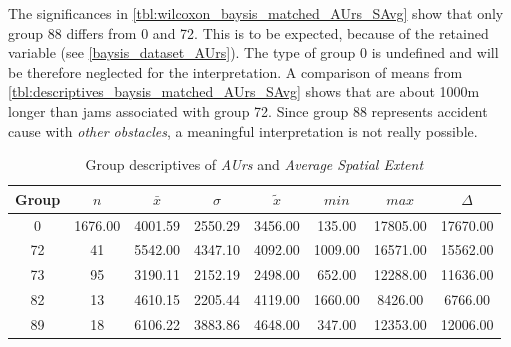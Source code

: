 The significances in \autoref{tbl:wilcoxon_baysis_matched_AUrs_SAvg} show that only group 88 differs from 0 and 72. This is to be expected, because of the retained variable (see \autoref{baysis_dataset_AUrs}). The type of group 0 is undefined and will be therefore neglected for the interpretation. A comparison of means from \autoref{tbl:descriptives_baysis_matched_AUrs_SAvg} shows that are about 1000m longer than jams associated with group 72. Since group 88 represents accident cause with \textit{other obstacles}, a meaningful interpretation is not really possible. 
\begin{table}[ht]
	\small
	\centering
	\begin{tabular}{c|c|c|c|c|c|c|c}
		\toprule
		Group & $n$ & $\bar{x}$ & $\sigma$ & $\tilde{x}$ & $min$ & $max$ & $\Delta$ \\ 
		\midrule
		0  & 1676.00 & 4001.59 & 2550.29 & 3456.00 & 135.00 & 17805.00 & 17670.00 \\ 
		72 & 41 & 5542.00 & 4347.10 & 4092.00 & 1009.00 & 16571.00 & 15562.00 \\ 
		73 & 95 & 3190.11 & 2152.19 & 2498.00 & 652.00 & 12288.00 & 11636.00 \\ 
		82 & 13 & 4610.15 & 2205.44 & 4119.00 & 1660.00 & 8426.00 & 6766.00 \\ 
		89 & 18 & 6106.22 & 3883.86 & 4648.00 & 347.00 & 12353.00 & 12006.00 \\ 
		\bottomrule
	\end{tabular}
	\caption{Group descriptives of \textit{AUrs} and \textit{Average Spatial Extent}}
	\label{tbl:descriptives_baysis_matched_AUrs_SAvg}
\end{table}

